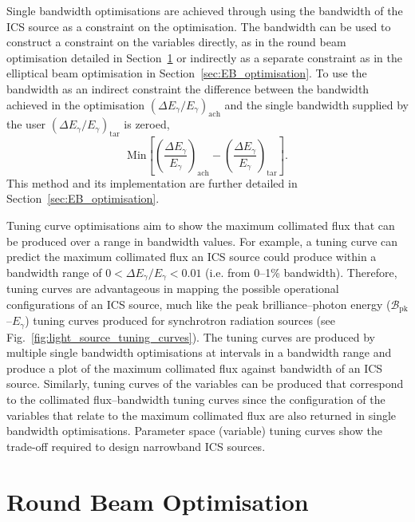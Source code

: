 \documentclass[../main.tex]{subfiles}
\begin{document}
Single bandwidth optimisations are achieved through using the bandwidth of the ICS source as a constraint on the optimisation. The bandwidth can be used to construct a constraint on the variables directly, as in the round beam optimisation detailed in Section~\ref{sec:RB_optimisation} or indirectly as a separate constraint as in the elliptical beam optimisation in Section~\ref{sec:EB_optimisation}. To use the bandwidth as an indirect constraint the difference between the bandwidth achieved in the optimisation $\left(\Delta E_{\gamma}/E_{\gamma}\right)_{\mathrm{ach}}$ and the single bandwidth supplied by the user $\left(\Delta E_{\gamma}/E_{\gamma}\right)_{\mathrm{tar}}$ is zeroed,
\begin{equation}
\mathrm{Min}\left[\left(\frac{\Delta E_{\gamma}}{E_{\gamma}}\right)_{\mathrm{ach}} - \left(\frac{\Delta E_{\gamma}}{E_{\gamma}}\right)_{\mathrm{tar}}\right].
\label{eq:single_bandiwdth_constraint}
\end{equation}
This method and its implementation are further detailed in Section~\ref{sec:EB_optimisation}.

Tuning curve optimisations aim to show the maximum collimated flux that can be produced over a range in bandwidth values. For example, a tuning curve can predict the maximum collimated flux an ICS source could produce within a bandwidth range of $0 < \Delta E_{\gamma}/E_{\gamma} < 0.01$ (i.e. from 0--1\% bandwidth). Therefore, tuning curves are advantageous in mapping the possible operational configurations of an ICS source, much like the peak brilliance--photon energy ($\mathcal{B}_{\mathrm{pk}}$--$E_{\gamma}$) tuning curves produced for synchrotron radiation sources (see Fig.~\ref{fig:light_source_tuning_curves}). The tuning curves are produced by multiple single bandwidth optimisations at intervals in a bandwidth range and produce a plot of the maximum collimated flux against bandwidth of an ICS source. Similarly, tuning curves of the variables can be produced that correspond to the collimated flux--bandwidth tuning curves since the configuration of the variables that relate to the maximum collimated flux are also returned in single bandwidth optimisations. Parameter space (variable) tuning curves show the trade-off required to design narrowband ICS sources. 

\section{Round Beam Optimisation}
\label{sec:RB_optimisation}
\end{document}
